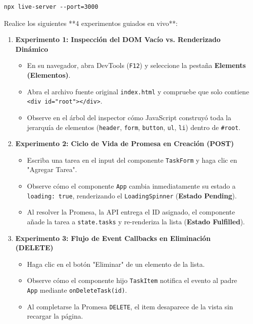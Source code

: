 \documentclass[10pt,letterpaper]{article}
\begin{document}
\begin{lstlisting}[style=bashstyle]
npx live-server --port=3000
\end{lstlisting}

Realice los siguientes **4 experimentos guiados en vivo**:

\begin{enumerate}[leftmargin=*,itemsep=3pt,topsep=2pt]
  \item \textbf{Experimento 1: Inspección del DOM Vacío vs. Renderizado Dinámico}
    \begin{itemize}
      \item En su navegador, abra DevTools (\texttt{F12}) y seleccione la pestaña \textbf{Elements (Elementos)}.
      \item Abra el archivo fuente original \texttt{index.html} y compruebe que solo contiene \texttt{<div id="root"></div>}.
      \item Observe en el árbol del inspector cómo JavaScript construyó toda la jerarquía de elementos (\texttt{header}, \texttt{form}, \texttt{button}, \texttt{ul}, \texttt{li}) dentro de \texttt{\#root}.
    \end{itemize}
  \item \textbf{Experimento 2: Ciclo de Vida de Promesa en Creación (POST)}
    \begin{itemize}
      \item Escriba una tarea en el input del componente \texttt{TaskForm} y haga clic en "Agregar Tarea".
      \item Observe cómo el componente \texttt{App} cambia inmediatamente su estado a \texttt{loading: true}, renderizando el \texttt{LoadingSpinner} (\textbf{Estado Pending}).
      \item Al resolver la Promesa, la API entrega el ID asignado, el componente añade la tarea a \texttt{state.tasks} y re-renderiza la lista (\textbf{Estado Fulfilled}).
    \end{itemize}
  \item \textbf{Experimento 3: Flujo de Event Callbacks en Eliminación (DELETE)}
    \begin{itemize}
      \item Haga clic en el botón "Eliminar" de un elemento de la lista.
      \item Observe cómo el componente hijo \texttt{TaskItem} notifica el evento al padre \texttt{App} mediante \texttt{onDeleteTask(id)}.
      \item Al completarse la Promesa \texttt{DELETE}, el item desaparece de la vista sin recargar la página.

\end{itemize}
\end{enumerate}
\end{document}
